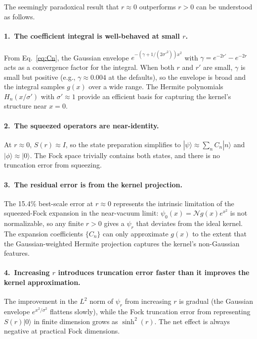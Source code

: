 \documentclass[11pt]{article}
\begin{document}
The seemingly paradoxical result that $r \approx 0$ outperforms $r > 0$
can be understood as follows.

\paragraph{1.\ The coefficient integral is well-behaved at small $r$.}
From Eq.~\eqref{eq:Cn}, the Gaussian envelope
$e^{-(\gamma + 1/(2\sigma'^2))x^2}$ with
$\gamma = e^{-2r'} - e^{-2r}$ acts as a convergence factor for the
integral.  When both $r$ and $r'$ are small, $\gamma$ is small but positive
(e.g., $\gamma \approx 0.004$ at the defaults), so the envelope is broad
and the integral samples $g(x)$ over a wide range.  The Hermite polynomials
$H_n(x/\sigma')$ with $\sigma' \approx 1$ provide an efficient basis for
capturing the kernel's structure near $x = 0$.

\paragraph{2.\ The squeezed operators are near-identity.}
At $r \approx 0$, $S(r) \approx I$, so the state preparation simplifies to
$|\psi\rangle \approx \sum_n C_n |n\rangle$ and
$|\phi\rangle \approx |0\rangle$.
The Fock space trivially contains both states, and there is no truncation
error from squeezing.

\paragraph{3.\ The residual error is from the kernel projection.}
The 15.4\% best-scale error at $r \approx 0$ represents the intrinsic
limitation of the squeezed-Fock expansion in the near-vacuum limit:
$\psi_0(x) = \mathcal{N}g(x)e^{x^2}$ is not normalizable, so any finite
$r > 0$ gives a $\psi_r$ that deviates from the ideal kernel.  The
expansion coefficients $\{C_n\}$ can only approximate $g(x)$ to the extent
that the Gaussian-weighted Hermite projection captures the kernel's
non-Gaussian features.

\paragraph{4.\ Increasing $r$ introduces truncation error faster than it
improves the kernel approximation.}
The improvement in the $L^2$ norm of $\psi_r$ from increasing $r$ is
gradual (the Gaussian envelope $e^{x^2/\sigma^2}$ flattens slowly), while
the Fock truncation error from representing $S(r)|0\rangle$ in finite
dimension grows as $\sinh^2(r)$.  The net effect is always negative at
practical Fock dimensions.
\end{document}
